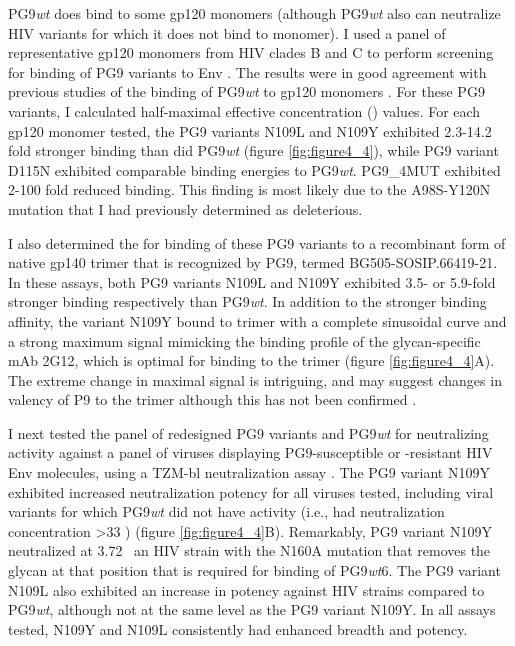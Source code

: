 PG9\textit{wt} does bind to some gp120 monomers (although PG9\textit{wt} also can neutralize HIV variants for which it does not bind to monomer). I used a panel of representative gp120 monomers from HIV clades B and C to perform screening for binding of PG9 variants to Env \citep{Li:2006kv,Li:2005go}. The results were in good agreement with previous studies of the binding of PG9\textit{wt} to gp120 monomers \citep{McLellan:2011dg}. For these PG9 variants, I calculated half-maximal effective concentration (\ec) values. For each gp120 monomer tested, the PG9 variants N109L and N109Y exhibited 2.3-14.2 fold stronger binding than did PG9\textit{wt} (figure \ref{fig:figure4_4}), while PG9 variant D115N exhibited comparable binding energies to PG9\textit{wt}. PG9\_4MUT exhibited 2-100 fold reduced binding. This finding is most likely due to the A98S-Y120N mutation that I had previously determined as deleterious.

I also determined the \ec for binding of these PG9 variants to a recombinant form of native gp140 trimer that is recognized by PG9, termed BG505-SOSIP.66419-21. In these assays, both PG9 variants N109L and N109Y exhibited 3.5- or 5.9-fold stronger binding respectively than PG9\textit{wt}. In addition to the stronger binding affinity, the variant N109Y bound to trimer with a complete sinusoidal curve and a strong maximum signal mimicking the binding profile of the glycan-specific mAb 2G12, which is optimal for binding to the trimer \citep{Sanders:2013gm}  (figure \ref{fig:figure4_4}A). The extreme change in maximal signal is intriguing, and may suggest changes in valency of P9 to the trimer although this has not been confirmed \citep{Julien:2013jp}.

I next tested the panel of redesigned PG9 variants and PG9\textit{wt} for neutralizing activity against a panel of viruses displaying PG9-susceptible or -resistant HIV Env molecules, using a TZM-bl neutralization assay \citep{Montefiori:2009hj}. The PG9 variant N109Y exhibited increased neutralization potency for all viruses tested, including viral variants for which PG9\textit{wt} did not have activity (i.e., had neutralization concentration >33 \mcml) (figure \ref{fig:figure4_4}B). Remarkably, PG9 variant N109Y neutralized at 3.72 \mcml~an HIV strain with the N160A mutation that removes the glycan at that position that is required for binding of PG9\textit{wt}6. The PG9 variant N109L also exhibited an increase in potency against HIV strains compared to PG9\textit{wt}, although not at the same level as the PG9 variant N109Y. In all assays tested, N109Y and N109L consistently had enhanced breadth and potency.

